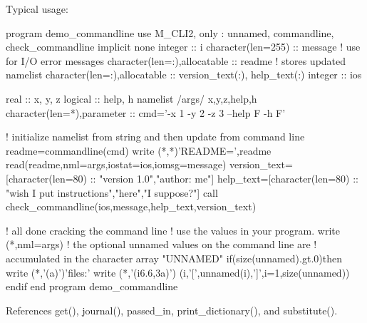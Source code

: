 Typical usage\+: \begin{DoxyVerb} program demo_commandline
 use M_CLI2,  only : unnamed, commandline, check_commandline
 implicit none
 integer                      :: i
 character(len=255)           :: message ! use for I/O error messages
 character(len=:),allocatable :: readme  ! stores updated namelist
 character(len=:),allocatable :: version_text(:), help_text(:)
 integer                      :: ios

 real               :: x, y, z
 logical            :: help, h
 namelist /args/ x,y,z,help,h
 character(len=*),parameter :: cmd='-x 1 -y 2 -z 3 --help F -h F'

 ! initialize namelist from string and then update from command line
 readme=commandline(cmd)
 write (*,*)'README=',readme
 read(readme,nml=args,iostat=ios,iomsg=message)
 version_text=[character(len=80) :: "version 1.0","author: me"]
 help_text=[character(len=80) :: "wish I put instructions","here","I suppose?"]
 call check_commandline(ios,message,help_text,version_text)

 ! all done cracking the command line
 ! use the values in your program.
 write (*,nml=args)
 ! the optional unnamed values on the command line are
 ! accumulated in the character array "UNNAMED"
 if(size(unnamed).gt.0)then
    write (*,'(a)')'files:'
    write (*,'(i6.6,3a)') (i,'[',unnamed(i),']',i=1,size(unnamed))
 endif
 end program demo_commandline \end{DoxyVerb}
 

References get(), journal(), passed\+\_\+in, print\+\_\+dictionary(), and substitute().

